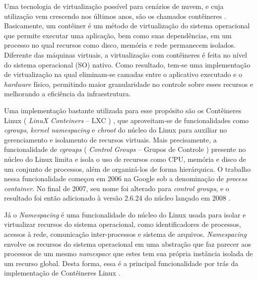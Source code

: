 
Uma tecnologia de virtualização possível para cenários de nuvem, e cuja utilização vem crescendo nos últimos anos, são os chamados contêineres \cite{containers-tech:2014}. 
%
Basicamente, um contêiner é um método de virtualização do sistema operacional que permite executar uma aplicação, bem como suas dependências, em um processo no qual recursos como disco, memória e rede permanecem isolados.
%
Diferente das máquinas virtuais, a virtualização com contêineres é feita no nível do sistema operacional (SO) nativo.
%
Como resultado, tem-se uma implementação de virtualização na qual eliminam-se camadas entre o aplicativo executado e o \textit{hardware} físico, permitindo maior granularidade no controle sobre esses recursos e melhorando a eficiência da infraestrutura.


Uma implementação bastante utilizada para esse propósito são os Contêineres Linux ( \textit{LinuX Conteiners} -- LXC ) \cite{Linuxcontainers.org2015}, que aproveitam-se de funcionalidades como \textit{cgroups}, \textit{kernel namespacing} e \textit{chroot} do núcleo do Linux para auxiliar no gerenciamento e isolamento de recursos virtuais.
%
Mais precisamente, a funcionalidade de \textit{cgroups} ( \textit{Control Groups} -- Grupos de Controle ) presente no núcleo do Linux limita e isola o uso de recursos como CPU, memória e disco de um conjunto de processos, além de organizá-los de forma hierárquica. 
%
O trabalho nessa funcionalidade começou em 2006 na Google sob a denominação de \textit{process container}. 
%
No final de 2007, seu nome foi alterado para \textit{control groups}, e o resultado foi então adicionado à versão 2.6.24 do núcleo lançado em 2008 \cite{UnixManPagesControlGroups}.

Já o \textit{Namespacing} é uma funcionalidade do núcleo do Linux usada para isolar e virtualizar recursos do sistema operacional, como identificadores de processos, acessos à rede, comunicação inter-processos e sistema de arquivos.
%
\textit{Namespacing} envolve os recursos do sistema operacional em uma abstração que faz parecer aos processos de um mesmo \textit{namespace} que estes tem sua própria instância isolada de um recurso global.
%
Desta forma, essa é a principal funcionalidade por trás da implementação de Contêineres Linux \cite{UnixManPagesNamespacing}.


